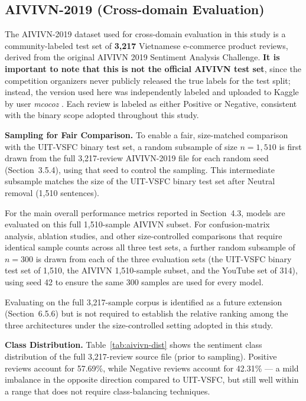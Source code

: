 \documentclass[12pt]{report} %
\begin{document}
\subsection{AIVIVN-2019 (Cross-domain Evaluation)}

The AIVIVN-2019 dataset used for cross-domain evaluation in this study is a community-labeled test set of \textbf{3,217} Vietnamese e-commerce product reviews, derived from the original AIVIVN 2019 Sentiment Analysis Challenge. \textbf{It is important to note that this is not the official AIVIVN test set}, since the competition organizers never publicly released the true labels for the test split; instead, the version used here was independently labeled and uploaded to Kaggle by user \textit{mcocoz} \cite{aivivn2019kaggle}. Each review is labeled as either Positive or Negative, consistent with the binary scope adopted throughout this study.

\textbf{Sampling for Fair Comparison.}
To enable a fair, size-matched comparison with the UIT-VSFC binary test set, a random subsample of size $n = 1{,}510$ is first drawn from the full 3,217-review AIVIVN-2019 file for each random seed (Section~3.5.4), using that seed to control the sampling. This intermediate subsample matches the size of the UIT-VSFC binary test set after Neutral removal (1,510 sentences).

For the main overall performance metrics reported in Section~4.3, models are evaluated on this full 1,510-sample AIVIVN subset. For confusion-matrix analysis, ablation studies, and other size-controlled comparisons that require identical sample counts across all three test sets, a further random subsample of $n = 300$ is drawn from each of the three evaluation sets (the UIT-VSFC binary test set of 1,510, the AIVIVN 1,510-sample subset, and the YouTube set of 314), using seed 42 to ensure the same 300 samples are used for every model.

Evaluating on the full 3,217-sample corpus is identified as a future extension (Section~6.5.6) but is not required to establish the relative ranking among the three architectures under the size-controlled setting adopted in this study.

\textbf{Class Distribution.} Table~\ref{tab:aivivn-dist} shows the sentiment class distribution of the full 3,217-review source file (prior to sampling). Positive reviews account for 57.69\%, while Negative reviews account for 42.31\% --- a mild imbalance in the opposite direction compared to UIT-VSFC, but still well within a range that does not require class-balancing techniques.
\end{document}
